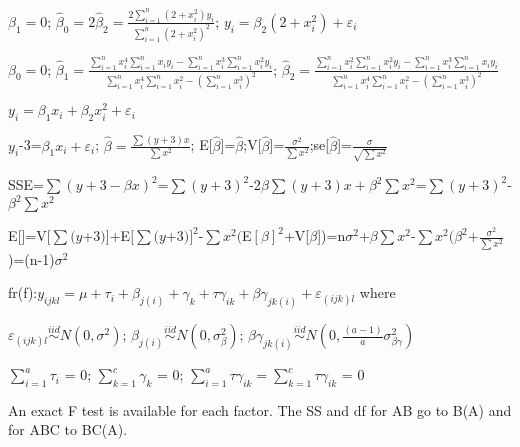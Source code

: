 \documentclass[
  10pt,
  twocolumn]{article}
\begin{document}
\dotfill

\(\beta_1=0\);
\(\hat\beta_0=2\hat\beta_2=\frac{2\sum_{i=1}^n(2+x_i^2)y_i}{\sum_{i=1}^n(2+x_i^2)^2}\);
\(y_i = \beta_2(2 + x_i^2) + \varepsilon_i\)

\dotfill

\(\beta_0 = 0\);
\(\hat\beta_1=\frac{\sum_{i=1}^nx_i^4\sum_{i=1}^nx_iy_i-\sum_{i=1}^nx_i^3\sum_{i=1}^nx_i^2y_i}{\sum_{i=1}^nx_i^4\sum_{i=1}^nx_i^2-(\sum_{i=1}^nx_i^3)^2}\);
\(\hat\beta_2=\frac{\sum_{i=1}^nx_i^2\sum_{i=1}^nx_i^2y_i-\sum_{i=1}^nx_i^3\sum_{i=1}^nx_iy_i}{\sum_{i=1}^nx_i^4\sum_{i=1}^nx_i^2-(\sum_{i=1}^nx_i^3)^2}\)

\(y_i = \beta_1x_i + \beta_2 x_i^2 + \varepsilon_i\)

\dotfill

\(y_i\)-3=\(\beta_1x_i + \varepsilon_i\);
\(\hat\beta=\frac{\sum(y+3)x}{\sum x^2}\);
E{[}\(\hat\beta\){]}=\(\hat\beta\);V{[}\(\hat\beta\){]}=\(\frac{\sigma^2}{\sum x^2}\);se{[}\(\hat\beta\){]}=\(\frac{\sigma}{\sqrt{\sum x^2}}\)

SSE=\(\sum(y+3-\beta x)^2\)=\(\sum(y+3)^2\)-2\(\beta\sum(y+3)x+\beta^2\sum x^2\)=\(\sum(y+3)^2\)-\(\beta^2\sum x^2\)

E{[}{]}=V{[}\(\sum(y\)+\(3)\){]}+E\([\sum(y\)+\(3)]^2\)-\(\sum x^2(\)E\([\beta]^2\)+V{[}\(\beta\){]})=n\(\sigma^2\)+\(\beta\sum x^2\)-\(\sum x^2(\beta^2\)+\(\frac{\sigma^2}{\sum x^2}\))=(n-1)\(\sigma^2\)

\hrulefill

fr(f):\(y_{ijkl} = \mu + \tau_i + \beta_{j(i)} + \gamma_k + \tau\gamma_{ik} + \beta\gamma_{jk(i)} + \varepsilon_{(ijk)l}\)
where

\(\varepsilon_{(ijk)l}\overset{iid}\sim N(0,\sigma^2)\);
\(\beta_{j(i)}\overset{iid}\sim N(0,\sigma^2_\beta)\);
\(\beta\gamma_{jk(i)} \overset{iid}\sim N(0,\frac{(a-1)}{a}\sigma^2_{\beta\gamma})\)

\(\sum_{i=1}^{a}\tau_i\) = 0; \(\sum_{k=1}^{c}\gamma_k\) = 0;
\(\sum_{i=1}^{a}\tau\gamma_{ik} = \sum_{k=1}^{c}\tau\gamma_{ik}\) = 0

An exact F test is available for each factor. The SS and df for AB go to
B(A) and for ABC to BC(A).
\end{document}

